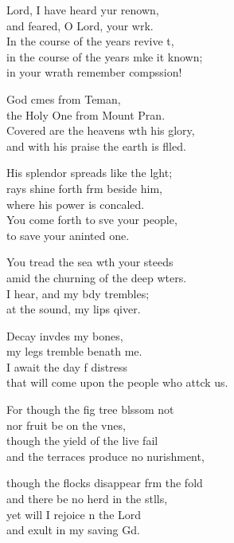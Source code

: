 \settowidth{\versewidth}{that will come upon the people who attack us.}
\begin{psalmverse}%
  \begin{patverse}
 Lord, I have heard yur renown,\Med\\
and feared, O Lord, your wrk.\\
In the course of the years revive \pointup{\i}t,\Flex\\
in the course of the years mke it known;\Med\\
in your wrath remember compssion!

God cmes from Teman,\Med\\
the Holy One from Mount Pran.\\
Covered are the heavens w\pointup{\i}th his glory,\Med\\
and with his praise the earth is f\pointup{\i}lled.

His splendor spreads like the l\pointup{\i}ght;\Flex\\
rays shine forth frm beside him,\Med\\
where his power is concaled.\\
You come forth to sve your people,\Med\\
to save your aninted one.

You tread the sea w\pointup{\i}th your steeds\Med\\
amid the churning of the deep wters.\\
I hear, and my bdy trembles;\Med\\
at the sound, my lips qiver.

Decay invdes my bones,\Med\\
my legs tremble benath me.\\
I await the day f distress\Med\\
that will come upon the people who attck us.

For though the fig tree blssom not\Med\\
nor fruit be on the v\pointup{\i}nes,\\
though the yield of the live fail\Med\\
and the terraces produce no nurishment,

though the flocks disappear frm the fold\Med\\
and there be no herd in the stlls,\\
yet will I rejoice \pointup{\i}n the Lord\Med\\
and exult in my saving Gd.


\end{patverse}
\end{psalmverse}

